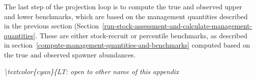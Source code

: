 \documentclass[11pt]{book}
\begin{document}
The last step of the projection loop is to compute the true and observed upper and lower benchmarks, which are based on the management quantities described in the previous section (Section~\ref{run-stock-assessment-and-calculate-management-quantities}. These are either stock-recruit or percentile benchmarks, as described in section~\ref{compute-management-quantities-and-benchmarks} computed based on the true and observed spawner abundances.


\clearpage

\hypertarget{retrospective-analysis-of-cu-benchmarks-based-on-sgen-and-percentiles}{%
\label{retrospective-analysis-of-cu-benchmarks-based-on-sgen-and-percentiles}}

\emph{\textbackslash textcolor\{cyan\}\{LT: open to other name of this appendix}
\end{document}
